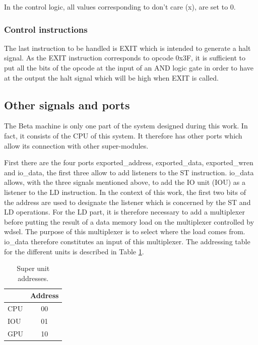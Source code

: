 In the control logic, all values corresponding to don't care (x), are set to 0. 

\subsubsection*{Control instructions}

The last instruction to be handled is EXIT which is intended to generate a halt signal. As the EXIT 
instruction corresponds to opcode 0x3F, it is sufficient to put all the bits of the opcode at the 
input of an AND logic gate in order to have at the output the halt signal which will be high when 
EXIT is called.

\subsection{Other signals and ports}

The Beta machine is only one part of the system designed during this work. In fact, it consists of the 
CPU of this system. It therefore has other ports which allow its connection with other super-modules. 

First there are the four ports exported\_address, exported\_data, exported\_wren and io\_data,
the first three allow to add listeners to the ST instruction. io\_data allows, with the 
three signals mentioned above, to add the IO unit (IOU) as a listener to the LD instruction. In the 
context of this work, the first two bits of the address are used to designate the listener which 
is concerned by the ST and LD operations. For the LD part, it is therefore necessary to add a 
multiplexer before putting the result of a data memory load on the multiplexer controlled by wdsel. 
The purpose of this multiplexer is to select where the load comes from. io\_data therefore 
constitutes an input of this multiplexer. The addressing table for the different units is described 
in Table \ref{tab:beta/address}. 

\begin{table}[H]
    \centering
    \begin{tabular}{|l|c|}
    \hline
    \rowcolor[HTML]{DAE8FC} 
    \multicolumn{1}{|c|}{\cellcolor[HTML]{DAE8FC}\textbf{Super unit}} & \textbf{Address} \\ \hline
    CPU                                                               & 00               \\ \hline
    IOU                                                               & 01               \\ \hline
    GPU                                                               & 10               \\ \hline
    \end{tabular}
    \caption{Super unit addresses.}
    \label{tab:beta/address}
\end{table}


